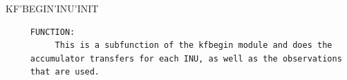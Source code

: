 \begin{frame}
KF'BEGIN'INU'INIT
\begin{verbatim}
     FUNCTION:
          This is a subfunction of the kfbegin module and does the
     accumulator transfers for each INU, as well as the observations
     that are used.

\end{verbatim}
\end{frame}
